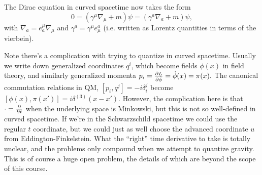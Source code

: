 The Dirac equation in curved spacetime now takes the form
$$0=(\gamma^\mu \nabla_\mu +m)\psi =(\gamma^a \nabla_a +m) \psi,$$
with $\nabla_a = e^\mu_a \nabla_\mu$ and $\gamma^a = \gamma^\mu e^a_\mu$ (i.e. written as Lorentz quantities in terms of the vierbein).

Note there's a complication with trying to quantize in curved spacetime. Usually we write down generalized coordinates $q^i$, which become fields $\phi(x)$ in field theory, and similarly generalized momenta $p_i = \P{L}{\dot \phi}=\dot \phi(x)=\pi(x).$
The canonical commutation relations in QM, $[p_i, q^j]=-i \delta^j_i$ become
$[\phi(x),\pi(x')]=i\delta^{(3)}(x-x')$. However, the complication here is that $\cdot=\P{}{t}$ when the underlying space is Minkowski, but this is not so well-defined in curved spacetime. If we're in the Schwarzschild spacetime we could use the regular $t$ coordinate, but we could just as well choose the advanced coordinate $u$ from Eddington-Finkelstein. What the ``right'' time derivative to take is totally unclear, and the problems only compound when we attempt to quantize gravity. This is of course a huge open problem, the details of which are beyond the scope of this course.

